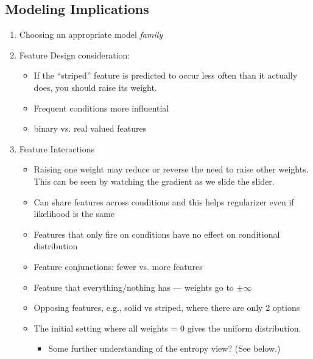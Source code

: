 \documentclass[11pt,letterpaper]{article}
\begin{document}
\subsection{Modeling Implications}
\begin{enumerate}
\item Choosing an appropriate model \textit{family}%
\item Feature Design consideration:
\begin{itemize}
\item If the “striped” feature is predicted to occur less often than it actually does, you should raise its weight.
\item Frequent conditions more influential
\item binary vs. real valued features
\end{itemize}

\item Feature Interactions
\begin{itemize} 
\item Raising one weight may reduce or reverse the need to raise other weights.  This can be seen by watching the gradient as we slide the slider.
\item Can share features across conditions and this helps regularizer even if likelihood is the same
\item Features that only fire on conditions have no effect on conditional distribution
\item Feature conjunctions: fewer vs. more features
\item Feature that everything/nothing has --- weights go to $\pm \infty$
\item Opposing features, e.g., solid vs striped, where there are only 2 options
\item The initial setting where all weights = 0 gives the uniform distribution.
\begin{itemize}
\item Some further understanding of the entropy view?  (See below.)
\end{itemize}
\end{itemize}
\end{enumerate}
\end{document}
